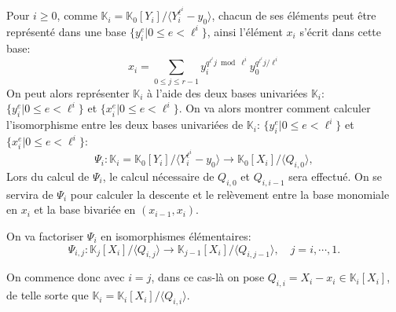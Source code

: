 \documentclass[10pt,a4paper]{book}
\theoremstyle{plain}
\theoremstyle{definition}
\theoremstyle{definition}
\theoremstyle{definition}
\theoremstyle{definition}
\theoremstyle{remark}
\theoremstyle{remark}
\begin{document}
Pour $i \geqslant 0$, comme $\mathbb{K}_i=\mathbb{K}_0[Y_i]/\langle Y_i^{\ell^i} - y_0 \rangle$, chacun de ses éléments peut être représenté dans une base $ \{y_i^e | 0 \leqslant e < \ell^i \} $, ainsi l'élément $x_i$ s'écrit dans cette base:
\begin{equation*}
x_i= \sum_{0 \leqslant j \leqslant r-1}y_i^{q^{\ell^i}j \bmod \ell^i}y_0^{q^{\ell^i}j / \ell^i}
\end{equation*}
On peut alors représenter $\mathbb{K}_i$ à l'aide des deux bases univariées $\mathbb{K}_i$: $\{ y_i^e | 0 \leqslant e < \ell^i\}$ et $\{x_i^e | 0 \leqslant e < \ell^i\}$. On va alors montrer comment calculer l'isomorphisme entre les deux bases univariées de $\mathbb{K}_i$: $\{ y_i^e | 0 \leqslant e < \ell^i\}$ et $\{x_i^e | 0 \leqslant e < \ell^i\}$:
\begin{equation*}
\Psi_i: \mathbb{K}_i=\mathbb{K}_0[Y_i]/\langle Y_i^{\ell^i}-y_0 \rangle \to \mathbb{K}_0[X_i]/\langle Q_{i,0} \rangle,
\end{equation*}
 Lors du calcul de $\Psi_i$, le calcul nécessaire de $Q_{i,0}$ et $Q_{i,i-1}$ sera effectué. On se servira de $\Psi_i$ pour calculer la descente et le relèvement entre la base monomiale en $x_i$ et la base bivariée en $(x_{i-1},x_i)$.
 
 On va factoriser $\Psi_i$ en isomorphismes élémentaires:
 \begin{equation*}
 \Psi_{i,j}:\mathbb{K}_{j}[X_i]/\langle Q_{i,j} \rangle \to \mathbb{K}_{j-1}[X_i]/ \langle Q_{i,j-1} \rangle, \quad j=i, \cdots,1. 
 \end{equation*}
 
On commence donc avec $i=j$, dans ce cas-là on pose $Q_{i,i}=X_i-x_i \in \mathbb{K}_i[X_i]$, de telle sorte que $\mathbb{K}_i=\mathbb{K}_i[X_i] / \langle Q_{i,i} \rangle $.
\end{document}
